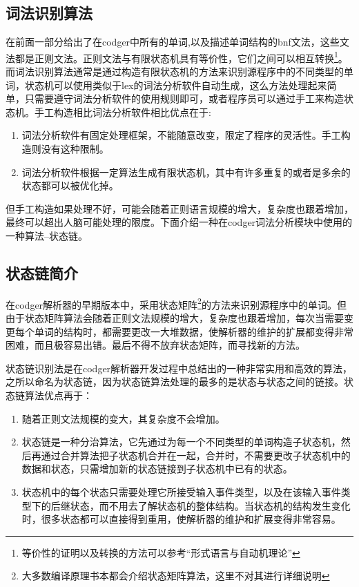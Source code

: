 \documentclass[a4paper,11pt]{article}
\begin{document}
\begin{CJK}{UTF8}{gbsn}
\section{词法识别算法}
在前面一部分给出了在codger中所有的单词,以及描述单词结构的bnf文法，这些文法都是正则文法。正则文法与有限状态机具有等价性，它们之间可以相互转换\footnote{等价性的证明以及转换的方法可以参考``形式语言与自动机理论''}。而词法识别算法通常是通过构造有限状态机的方法来识别源程序中的不同类型的单词，状态机可以使用类似于lex的词法分析软件自动生成，这么方法处理起来简单，只需要遵守词法分析软件的使用规则即可，或者程序员可以通过手工来构造状态机。手工构造相比词法分析软件相比优点在于:
\begin{enumerate}
 \item 词法分析软件有固定处理框架，不能随意改变，限定了程序的灵活性。手工构造则没有这种限制。
 \item 词法分析软件根据一定算法生成有限状态机，其中有许多重复的或者是多余的状态都可以被优化掉。
\end{enumerate}
但手工构造如果处理不好，可能会随着正则语言规模的增大，复杂度也跟着增加，最终可以超出人脑可能处理的限度。下面介绍一种在codger词法分析模块中使用的一种算法--状态链。
\subsection{状态链简介}
在codger解析器的早期版本中，采用状态矩阵\footnote{大多数编译原理书本都会介绍状态矩阵算法，这里不对其进行详细说明}的方法来识别源程序中的单词。但由于状态矩阵算法会随着正则文法规模的增大，复杂度也跟着增加，每次当需要变更每个单词的结构时，都需要更改一大堆数据，使解析器的维护的扩展都变得非常困难，而且极容易出错。最后不得不放弃状态矩阵，而寻找新的方法。

状态链识别法是在codger解析器开发过程中总结出的一种非常实用和高效的算法，之所以命名为状态链，因为状态链算法处理的最多的是状态与状态之间的链接。状态链算法优点再于：
\begin{enumerate}
 \item 随着正则文法规模的变大，其复杂度不会增加。
 \item 状态链是一种分治算法，它先通过为每一个不同类型的单词构造子状态机，然后再通过合并算法把子状态机合并在一起，合并时，不需要更改子状态机中的数据和状态，只需增加新的状态链接到子状态机中已有的状态。
 \item 状态机中的每个状态只需要处理它所接受输入事件类型，以及在该输入事件类型下的后继状态，而不用去了解状态机的整体结构。当状态机的结构发生变化时，很多状态都可以直接得到重用，使解析器的维护和扩展变得非常容易。
\end{enumerate}





\end{CJK}
\end{document}
